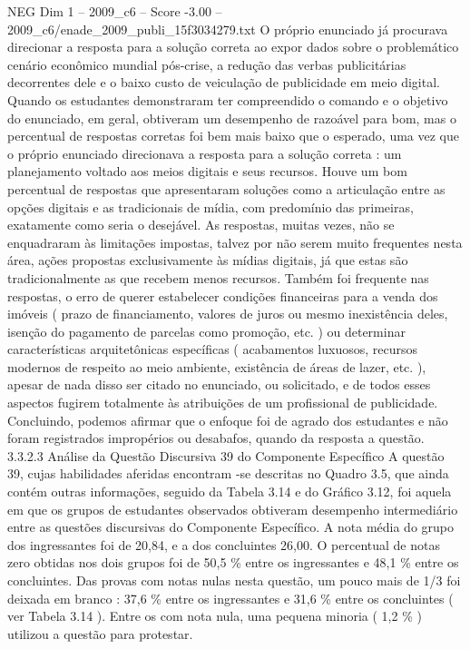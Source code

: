 \begin{textsample}{NEG Dim 1 – 2009\_c6 – Score -3.00 – 2009\_c6/enade\_2009\_publi\_15f3034279.txt}
O próprio enunciado já procurava direcionar a resposta para a solução correta ao expor dados sobre o problemático cenário econômico mundial pós-crise, a redução das verbas publicitárias decorrentes dele e o baixo custo de veiculação de publicidade em meio digital.
Quando os estudantes demonstraram ter compreendido o comando e o objetivo do enunciado, em geral, obtiveram um desempenho de razoável para bom, mas o percentual de respostas corretas foi bem mais baixo que o esperado, uma vez que o próprio enunciado direcionava a resposta para a solução correta : um planejamento voltado aos meios digitais e seus recursos.
Houve um bom percentual de respostas que apresentaram soluções como a articulação entre as opções digitais e as tradicionais de mídia, com predomínio das primeiras, exatamente como seria o desejável.
As respostas, muitas vezes, não se enquadraram às limitações impostas, talvez por não serem muito frequentes nesta área, ações propostas exclusivamente às mídias digitais, já que estas são tradicionalmente as que recebem menos recursos.
Também foi frequente nas respostas, o erro de querer estabelecer condições financeiras para a venda dos imóveis ( prazo de financiamento, valores de juros ou mesmo inexistência deles, isenção do pagamento de parcelas como promoção, etc. ) ou determinar características arquitetônicas específicas ( acabamentos luxuosos, recursos modernos de respeito ao meio ambiente, existência de áreas de lazer, etc. ), apesar de nada disso ser citado no enunciado, ou solicitado, e de todos esses aspectos fugirem totalmente às atribuições de um profissional de publicidade.
Concluindo, podemos afirmar que o enfoque foi de agrado dos estudantes e não foram registrados impropérios ou desabafos, quando da resposta a questão. 3.3.2.3 Análise da Questão Discursiva 39 do Componente Específico A questão 39, cujas habilidades aferidas encontram -se descritas no Quadro 3.5, que ainda contém outras informações, seguido da Tabela 3.14 e do Gráfico 3.12, foi aquela em que os grupos de estudantes observados obtiveram desempenho intermediário entre as questões discursivas do Componente Específico.
A nota média do grupo dos ingressantes foi de 20,84, e a dos concluintes 26,00.
O percentual de notas zero obtidas nos dois grupos foi de 50,5 \% entre os ingressantes e 48,1 \% entre os concluintes.
Das provas com notas nulas nesta questão, um pouco mais de 1/3 foi deixada em branco : 37,6 \% entre os ingressantes e 31,6 \% entre os concluintes ( ver Tabela 3.14 ).
Entre os com nota nula, uma pequena minoria ( 1,2 \% ) utilizou a questão para protestar.

\end{textsample}
